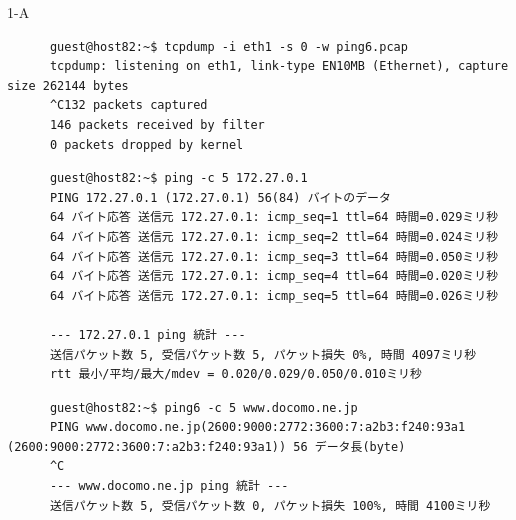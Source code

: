 \begin{maintask}{1-A}
  \begin{termout}[H]
    \caption{tcpdump(IPv6) の実行結果}\label{out:tcpdump_v6}
    \begin{verbatim}
      guest@host82:~$ tcpdump -i eth1 -s 0 -w ping6.pcap
      tcpdump: listening on eth1, link-type EN10MB (Ethernet), capture size 262144 bytes
      ^C132 packets captured
      146 packets received by filter
      0 packets dropped by kernel
    \end{verbatim}
  \end{termout}
  
  \begin{termout}[H]
    \caption{ping(IPv4) の実行結果}\label{out:ping_v4}
    \begin{verbatim}
      guest@host82:~$ ping -c 5 172.27.0.1                                                                                      
      PING 172.27.0.1 (172.27.0.1) 56(84) バイトのデータ                                                                               
      64 バイト応答 送信元 172.27.0.1: icmp_seq=1 ttl=64 時間=0.029ミリ秒                                                                    
      64 バイト応答 送信元 172.27.0.1: icmp_seq=2 ttl=64 時間=0.024ミリ秒                                                                    
      64 バイト応答 送信元 172.27.0.1: icmp_seq=3 ttl=64 時間=0.050ミリ秒                                                                    
      64 バイト応答 送信元 172.27.0.1: icmp_seq=4 ttl=64 時間=0.020ミリ秒                                                                    
      64 バイト応答 送信元 172.27.0.1: icmp_seq=5 ttl=64 時間=0.026ミリ秒                                                                    
                                                                                                                                
      --- 172.27.0.1 ping 統計 ---                                                                                                
      送信パケット数 5, 受信パケット数 5, パケット損失 0%, 時間 4097ミリ秒                                                                               
      rtt 最小/平均/最大/mdev = 0.020/0.029/0.050/0.010ミリ秒       
    \end{verbatim}
  \end{termout}

  \begin{termout}[H]
    \caption{ping6(IPv6) の実行結果}\label{out:ping_v6}
    \begin{verbatim}
      guest@host82:~$ ping6 -c 5 www.docomo.ne.jp                                                                               
      PING www.docomo.ne.jp(2600:9000:2772:3600:7:a2b3:f240:93a1 (2600:9000:2772:3600:7:a2b3:f240:93a1)) 56 データ長(byte)          
      ^C                                                                                                                        
      --- www.docomo.ne.jp ping 統計 ---                                                                                          
      送信パケット数 5, 受信パケット数 0, パケット損失 100%, 時間 4100ミリ秒       
    \end{verbatim}
  \end{termout}


\end{maintask}
